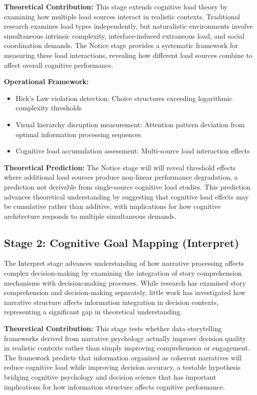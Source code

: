 \documentclass[
  authoryear,
  preprint]{elsarticle}
\providecommand{\tightlist}{%
  \setlength{\itemsep}{0pt}\setlength{\parskip}{0pt}}
\begin{document}
\textbf{Theoretical Contribution:} This stage extends cognitive load
theory by examining how multiple load sources interact in realistic
contexts. Traditional research examines load types independently, but
naturalistic environments involve simultaneous intrinsic complexity,
interface-induced extraneous load, and social coordination demands. The
Notice stage provides a systematic framework for measuring these load
interactions, revealing how different load sources combine to affect
overall cognitive performance.

\textbf{Operational Framework:}

\begin{itemize}
\tightlist
\item
  Hick's Law violation detection: Choice structures exceeding
  logarithmic complexity thresholds
\item
  Visual hierarchy disruption measurement: Attention pattern deviation
  from optimal information processing sequences
\item
  Cognitive load accumulation assessment: Multi-source load interaction
  effects
\end{itemize}

\textbf{Theoretical Prediction:} The Notice stage will will reveal
threshold effects where additional load sources produce non-linear
performance degradation, a prediction not derivable from single-source
cognitive load studies. This prediction advances theoretical
understanding by suggesting that cognitive load effects may be
cumulative rather than additive, with implications for how cognitive
architecture responds to multiple simultaneous demands.

\subsection{Stage 2: Cognitive Goal Mapping
(Interpret)}\label{stage-2-cognitive-goal-mapping-interpret}

The Interpret stage advances understanding of how narrative processing
affects complex decision-making by examining the integration of story
comprehension mechanisms with decision-making processes. While research
has examined story comprehension and decision-making separately, little
work has investigated how narrative structure affects information
integration in decision contexts, representing a significant gap in
theoretical understanding.

\textbf{Theoretical Contribution:} This stage tests whether data
storytelling frameworks derived from narrative psychology actually
improve decision quality in realistic contexts rather than simply
improving comprehension or engagement. The framework predicts that
information organized as coherent narratives will reduce cognitive load
while improving decision accuracy, a testable hypothesis bridging
cognitive psychology and decision science that has important
implications for how information structure affects cognitive
performance.
\end{document}
